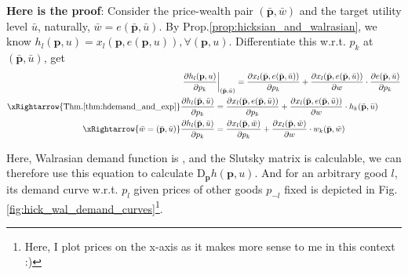 \textbf{Here is the proof}: Consider the price-wealth pair $(\bar{\mathbf{p}},\bar{w})$ and the target utility level $\bar{u}$, naturally, $\bar{w}=e(\bar{\mathbf{p}},\bar{u})$. By Prop.\ref{prop:hicksian_and_walrasian}, we know $h_l(\mathbf{p},u)=x_l(\mathbf{p},e(\mathbf{p},u)),\forall (\mathbf{p},u)$.
Differentiate this w.r.t. $p_k$ at $(\bar{\mathbf{p}},\bar{u})$, get
\begin{align*}
    & \left.\frac{\partial h_l(\mathbf{p},u)}{\partial p_k}\right\vert_{(\bar{\mathbf{p}},\bar{u})}=\frac{\partial x_l(\bar{\mathbf{p}},e(\bar{\mathbf{p}},\bar{u}))}{\partial p_k} + \frac{\partial x_l (\bar{\mathbf{p}},e(\bar{\mathbf{p}},\bar{u}))}{\partial w}\cdot \frac{\partial e(\bar{\mathbf{p}},\bar{u})}{\partial p_k} \\
    \xRightarrow{\text{Thm.\ref{thm:hdemand_and_exp}}} & \frac{\partial h_l(\bar{\mathbf{p}},\bar{u})}{\partial p_k} =\frac{\partial x_l(\bar{\mathbf{p}},e(\bar{\mathbf{p}},\bar{u}))}{\partial p_k} + \frac{\partial x_l (\bar{\mathbf{p}},e(\bar{\mathbf{p}},\bar{u}))}{\partial w}\cdot h_k(\bar{\mathbf{p}},\bar{u})\\
    \xRightarrow{\bar{w}=(\bar{\mathbf{p}},\bar{u})} & \frac{\partial h_l(\bar{\mathbf{p}},\bar{u})}{\partial p_k} =\frac{\partial x_l(\bar{\mathbf{p}},\bar{w})}{\partial p_k} + \frac{\partial x_l (\bar{\mathbf{p}},\bar{w})}{\partial w}\cdot w_k(\bar{\mathbf{p}},\bar{w})
\end{align*}

Here, Walrasian demand function is , and the Slutsky matrix is calculable, we can therefore use this equation to calculate $\mathrm{D}_{\mathbf{p}}h(\mathbf{p},u)$. And for an arbitrary good $l$, its demand curve w.r.t. $p_l$ given prices of other goods $p_{-l}$ fixed is depicted in Fig.\ref{fig:hick_wal_demand_curves}\footnote{Here, I plot prices on the x-axis as it makes more sense to me in this context :)}.

